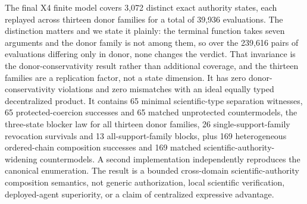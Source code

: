 The final X4 finite model covers 3,072 distinct exact authority states, each replayed across thirteen donor families for a total of 39,936 evaluations. The distinction matters and we state it plainly: the terminal function takes seven arguments and the donor family is not among them, so over the 239,616 pairs of evaluations differing only in donor, none changes the verdict. That invariance is the donor-conservativity result rather than additional coverage, and the thirteen families are a replication factor, not a state dimension. It has zero donor-conservativity violations and zero mismatches with an ideal equally typed decentralized product. It contains 65 minimal scientific-type separation witnesses, 65 protected-coercion successes and 65 matched unprotected countermodels, the three-state blocker law for all thirteen donor families, 26 single-support-family revocation survivals and 13 all-support-family blocks, plus 169 heterogeneous ordered-chain composition successes and 169 matched scientific-authority-widening countermodels. A second implementation independently reproduces the canonical enumeration. The result is a bounded cross-domain scientific-authority composition semantics, not generic authorization, local scientific verification, deployed-agent superiority, or a claim of centralized expressive advantage.
